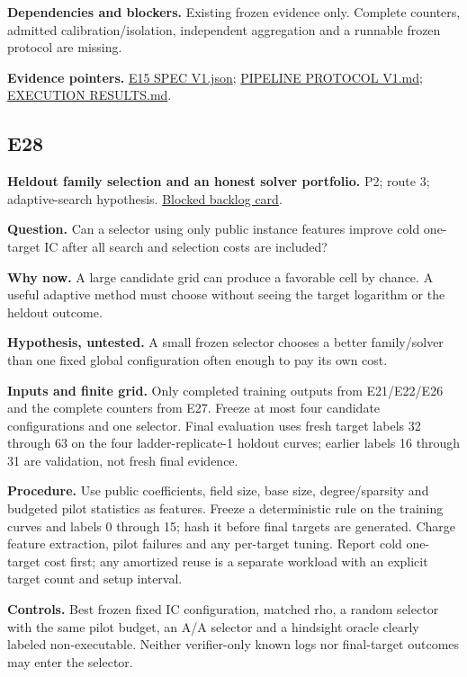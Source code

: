\documentclass[
  10pt,
]{article}
\begin{document}
\textbf{Dependencies and blockers.} Existing frozen evidence only.
Complete counters, admitted calibration/isolation, independent
aggregation and a runnable frozen protocol are missing.

\textbf{Evidence pointers.}
\href{../../../research/twist_routes_1_3_20261021/E15_SPEC_V1.json}{E15
SPEC V1.json};
\href{../../../research/twist_routes_1_3_20261021/PIPELINE_PROTOCOL_V1.md}{PIPELINE
PROTOCOL V1.md};
\href{../../../research/twist_routes_1_3_20261021/reports/EXECUTION_RESULTS.md}{EXECUTION
RESULTS.md}.

\subsection{E28}\label{e28}

\textbf{Heldout family selection and an honest solver portfolio.} P2;
route 3; adaptive-search hypothesis.
\href{../../../backlog/XP-20261022-twist-heldout-selection/README.md}{Blocked
backlog card}.

\textbf{Question.} Can a selector using only public instance features
improve cold one-target IC after all search and selection costs are
included?

\textbf{Why now.} A large candidate grid can produce a favorable cell by
chance. A useful adaptive method must choose without seeing the target
logarithm or the heldout outcome.

\textbf{Hypothesis, untested.} A small frozen selector chooses a better
family/solver than one fixed global configuration often enough to pay
its own cost.

\textbf{Inputs and finite grid.} Only completed training outputs from
E21/E22/E26 and the complete counters from E27. Freeze at most four
candidate configurations and one selector. Final evaluation uses fresh
target labels 32 through 63 on the four ladder-replicate-1 holdout
curves; earlier labels 16 through 31 are validation, not fresh final
evidence.

\textbf{Procedure.} Use public coefficients, field size, base size,
degree/sparsity and budgeted pilot statistics as features. Freeze a
deterministic rule on the training curves and labels 0 through 15; hash
it before final targets are generated. Charge feature extraction, pilot
failures and any per-target tuning. Report cold one-target cost first;
any amortized reuse is a separate workload with an explicit target count
and setup interval.

\textbf{Controls.} Best frozen fixed IC configuration, matched rho, a
random selector with the same pilot budget, an A/A selector and a
hindsight oracle clearly labeled non-executable. Neither verifier-only
known logs nor final-target outcomes may enter the selector.
\end{document}
